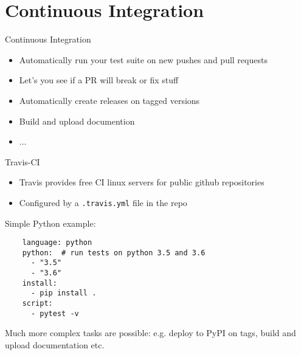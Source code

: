 \section{Continuous Integration}

\begin{frame}[c]{Continuous Integration}
  \begin{itemize}
    \item Automatically run your test suite on new pushes and pull requests
    \item Let's you see if a PR will break or fix stuff
    \item Automatically create releases on tagged versions
    \item Build and upload documention
    \item ...
  \end{itemize} 
\end{frame}
\begin{frame}[c, fragile]{Travis-CI}
  \begin{itemize}
    \item Travis provides free CI linux servers for public github repositories
    \item Configured by a \texttt{.travis.yml} file in the repo
  \end{itemize}

  Simple Python example:

  \begin{lstlisting}
    language: python
    python:  # run tests on python 3.5 and 3.6
      - "3.5"
      - "3.6"
    install:
      - pip install .
    script:
      - pytest -v
  \end{lstlisting}

  Much more complex tasks are possible: e.g. deploy to PyPI on tags, build and upload documentation etc.
\end{frame}
